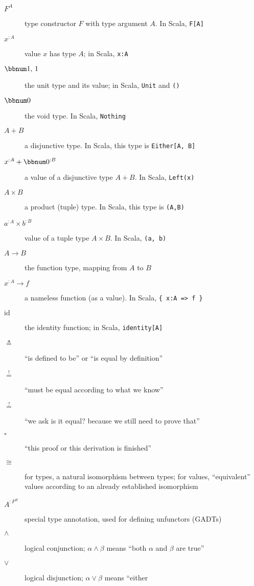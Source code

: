 \begin{description}
\item [{$F^{A}$}] type constructor $F$ with type argument $A$. In Scala,
\lstinline!F[A]!
\item [{$x^{:A}$}] value $x$ has type $A$; in Scala, \lstinline!x:A!
\item [{$\bbnum 1,\,1$}] the unit type and its value; in Scala, \lstinline!Unit!
and \lstinline!()!
\item [{$\bbnum 0$}] the void type. In Scala, \lstinline!Nothing!
\item [{$A+B$}] a disjunctive type. In Scala, this type is \lstinline!Either[A, B]! 
\item [{$x^{:A}+\bbnum 0^{:B}$}] a value of a disjunctive type $A+B$.
In Scala, \lstinline!Left(x)!
\item [{$A\times B$}] a product (tuple) type. In Scala, this type is \lstinline!(A,B)!
\item [{$a^{:A}\times b^{:B}$}] value of a tuple type $A\times B$. In
Scala, \lstinline!(a, b)!
\item [{$A\rightarrow B$}] the function type, mapping from $A$ to $B$
\item [{$x^{:A}\rightarrow f$}] a nameless function (as a value). In Scala,
\lstinline!{ x:A => f }!
\item [{$\text{id}$}] the identity function; in Scala, \lstinline!identity[A]!
\item [{$\triangleq$}] \textsf{``}is defined to be\textsf{''} or \textsf{``}is equal by definition\textsf{''}
\item [{$\overset{!}{=}$}] \textsf{``}must be equal according to what we know\textsf{''}
\item [{$\overset{?}{=}$}] \textsf{``}we ask \textemdash{} is it equal? \textemdash{}
because we still need to prove that\textsf{''}
\item [{$\square$}] \textsf{``}this proof or this derivation is finished\textsf{''}
\item [{$\cong$}] for types, a natural isomorphism between types; for
values, \textsf{``}equivalent\textsf{''} values according to an already established
isomorphism
\item [{$A^{:F^{B}}$}] special type annotation, used for defining unfunctors
(GADTs)
\item [{$\wedge$}] logical conjunction; $\alpha\wedge\beta$ means \textsf{``}both
$\alpha$ and $\beta$ are true\textsf{''}
\item [{$\vee$}] logical disjunction; $\alpha\vee\beta$ means \textsf{``}either

\end{description}
